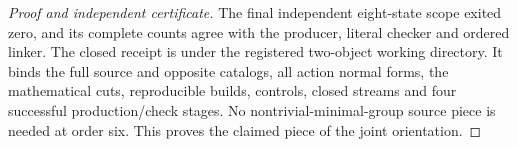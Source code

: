 \begin{proof}[Proof and independent certificate]
The final independent eight-state scope exited zero, and its complete
counts agree with the producer, literal checker and ordered linker.
The closed receipt is
under the registered two-object working directory.  It binds the full
source and opposite catalogs, all action normal forms, the mathematical
cuts, reproducible builds, controls, closed streams and four successful
production/check stages.  No nontrivial-minimal-group source piece is
needed at order six.  This proves the claimed piece of the joint
orientation.
\end{proof}

